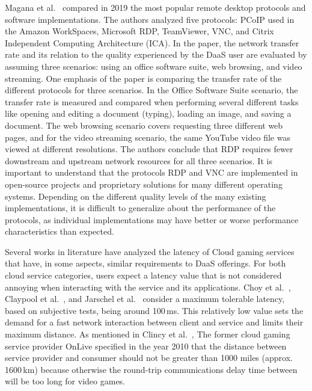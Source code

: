 \documentclass[runningheads]{llncs}
\begin{document}
Magana et al.~\cite{magana2019remote} compared in 2019 the most popular remote desktop protocols and software implementations. The authors analyzed five protocols: PCoIP used in the Amazon WorkSpaces, Microsoft RDP, TeamViewer, VNC, and Citrix Independent Computing Architecture (ICA). In the paper, the network transfer rate and its relation to the quality experienced by the DaaS user are evaluated by assuming three scenarios: using an office software suite, web browsing, and video streaming. One emphasis of the paper is comparing the transfer rate of the different protocols for three scenarios. In the Office Software Suite scenario, the transfer rate is measured and compared when performing several different tasks like opening and editing a document (typing), loading an image, and saving a document. The web browsing scenario covers requesting three different web pages, and for the video streaming scenario, the same YouTube video file was viewed at different resolutions. The authors conclude that RDP requires fewer downstream and upstream network resources for all three scenarios. It is important to understand that the protocols RDP and VNC are implemented in open-source projects and proprietary solutions for many different operating systems. Depending on the different quality levels of the many existing implementations, it is difficult to generalize about the performance of the protocols, as individual implementations may have better or worse performance characteristics than expected.

Several works in literature have analyzed the latency of Cloud gaming services that have, in some aspects, similar requirements to DaaS offerings. For both cloud service categories, users expect a latency value that is not considered annoying when interacting with the service and its applications. Choy et al.~\cite{ChoyWongSimonRosenberg2012}, Claypool et al.~\cite{claypool2010latency}, and Jarschel et al.~\cite{jarschel2011evaluation} consider a maximum tolerable latency, based on subjective tests, being around 100\,ms. This relatively low value sets the demand for a fast network interaction between client and service and limits their maximum distance. As mentioned in Clincy et al.~\cite{clincy2013subjective}, The former cloud gaming service provider OnLive specified in the year 2010 that the distance between service provider and consumer should not be greater than 1000 miles (approx. 1600\,km) because otherwise the round-trip communications delay time between will be too long for video games.
\end{document}
